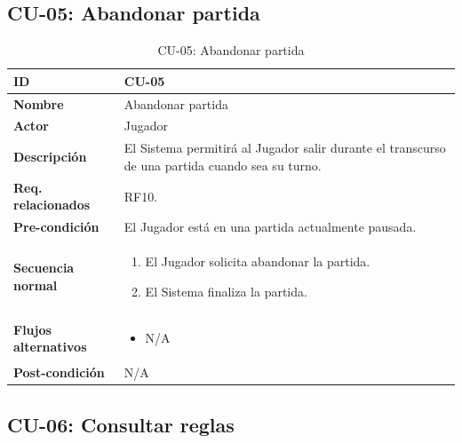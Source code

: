\subsection{CU-05: Abandonar partida}

\begin{table}[H]
	\centering
	\begin{tabular}{|p{3cm}|p{14cm}|}
		\hline \textbf{ID} & CU-05 \\
		\hline \textbf{Nombre} & Abandonar partida \\
		\hline \textbf{Actor} & Jugador \\
		\hline \textbf{Descripción} & El Sistema permitirá al Jugador salir durante el transcurso de una partida cuando sea su turno. \\
		\hline \textbf{Req. relacionados} & RF10. \\
		\hline \textbf{Pre-condición} & El Jugador está en una partida actualmente pausada. \\
		\hline
		\textbf{Secuencia normal} &
		\begin{enumerate}[nosep, before=\vspace{-0.4\baselineskip}]
			\item El Jugador solicita abandonar la partida.
			\item El Sistema finaliza la partida.
		\end{enumerate} \\
		\hline
		\textbf{Flujos alternativos} &
		\begin{itemize}[nosep, before=\vspace{-0.4\baselineskip}]
			\item N/A
		\end{itemize} \\
		\hline \textbf{Post-condición} & N/A \\
		\hline
	\end{tabular}
	\caption{CU-05: Abandonar partida}
	\label{tab:cu05}
\end{table}


\subsection{CU-06: Consultar reglas}

